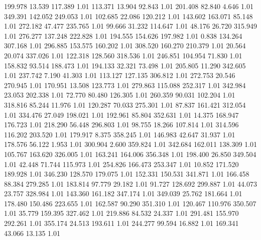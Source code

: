  199.978   13.539  117.389         1.01
 113.371   13.904   92.843         1.01
 201.408   82.840    4.646         1.01
 349.391  142.052  249.053         1.01
 102.685   22.086  120.212         1.01
 143.602  163.071   85.148         1.01
 272.182   47.477  235.765         1.01
  99.666   31.232  114.647         1.01
  48.176   26.720  315.949         1.01
 276.277  137.248  222.828         1.01
 194.555  154.626  197.982         1.01
   0.838  134.264  307.168         1.01
 296.885  153.575  160.202         1.01
 308.520  160.270  210.379         1.01
  20.564   20.074  337.026         1.01
 122.318  128.560  318.536         1.01
 246.851  104.954   71.830         1.01
 158.832   93.514  188.473         1.01
 194.133   32.321   73.498         1.01
 205.805   11.290  342.605         1.01
 237.742    7.190   41.303         1.01
 113.127  127.135  306.812         1.01
 272.753   20.546  270.945         1.01
 170.951   13.508  123.773         1.01
 279.863  115.088  252.317         1.01
 342.984   23.053  202.338         1.01
  72.770   80.480  126.305         1.01
 260.359   90.031  102.204         1.01
 318.816   85.244   11.976         1.01
 120.287   70.033  275.301         1.01
  87.837  161.421  312.054         1.01
 334.476   27.049  198.021         1.01
 192.961   85.804  352.631         1.01
  14.375  168.947  176.723         1.01
 218.290   56.448  296.803         1.01
  98.755   18.266  107.814         1.01
 314.596  116.202  203.520         1.01
 179.917    8.375  358.245         1.01
 146.983   42.647   31.937         1.01
 178.576   56.122    1.953         1.01
 300.904    2.600  359.824         1.01
 342.684  162.011  138.309         1.01
 105.767  163.620  326.005         1.01
 163.241  164.006  356.348         1.01
 198.400   26.850  349.504         1.01
  42.448   71.744  115.973         1.01
 254.826  166.473  253.347         1.01
  10.852  171.520  189.928         1.01
 346.230  128.570  179.075         1.01
 152.331  150.531  341.871         1.01
 166.458   88.384  279.285         1.01
 183.814   97.779   29.182         1.01
  91.727  128.692  299.887         1.01
  44.073   23.757  328.984         1.01
 143.360  161.182  347.174         1.01
 349.039   25.762  181.664         1.01
 178.480  150.486  223.655         1.01
 162.587   90.290  351.310         1.01
 120.467  110.976  350.507         1.01
  35.779  159.395  327.462         1.01
 219.886   84.532   24.337         1.01
 291.481  155.970  292.261         1.01
 355.174   24.513  193.611         1.01
 244.277   99.594   16.882         1.01
 169.341   43.066   13.135         1.01
